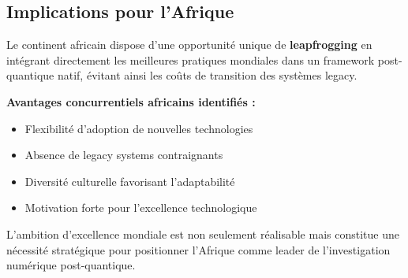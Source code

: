 \subsection{Implications pour l'Afrique}

Le continent africain dispose d'une opportunité unique de \textbf{leapfrogging} en intégrant directement les meilleures pratiques mondiales dans un framework post-quantique natif, évitant ainsi les coûts de transition des systèmes legacy.

\textbf{Avantages concurrentiels africains identifiés :}
\begin{itemize}
\item Flexibilité d'adoption de nouvelles technologies
\item Absence de legacy systems contraignants
\item Diversité culturelle favorisant l'adaptabilité
\item Motivation forte pour l'excellence technologique
\end{itemize}

L'ambition d'excellence mondiale est non seulement réalisable mais constitue une nécessité stratégique pour positionner l'Afrique comme leader de l'investigation numérique post-quantique.